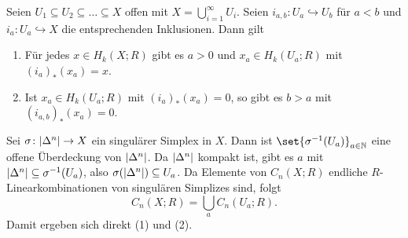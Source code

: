 \begin{proposition}[{name=[{Homologie von $X= \bigcup_{a \in N} U_a$ wobei $U_a \subseteq U_{a+1}$}]},label=prop:1011]
	Seien $U_1 \subseteq U_2 \subseteq \ldots  \subseteq X$ offen mit $X = \bigcup_{i=1}^\infty U_i$. 
	Seien $i_{a,b} \colon U_a \hookrightarrow U_b$ für $a < b$ und $i_a \colon U_a \hookrightarrow X$ die entsprechenden Inklusionen. Dann gilt
	\begin{enumerate}[(1)]
		\item Für jedes $x \in H_k(X;R)$ gibt es $a >0$ und $x_a \in H_k(U_a;R)$ mit $(i_a)_*(x_a)=x$.
		\item Ist $x_a \in H_k(U_a;R)$ mit $(i_a)_*(x_a)=0$, so gibt es $b >a$ mit $(i_{a,b})_*(x_a)=0$.
	\end{enumerate}
\end{proposition}
\begin{beweis}
	Sei $\sigma \colon \abs*{\Delta^n} \to X$ ein singulärer Simplex in $X$. Dann ist $\set{\sigma^{-1}(U_a)}_{a \in \mathbb{N}}$ eine offene Überdeckung von $\abs*{\Delta^n}$. 
	Da $\abs*{\Delta^n}$ kompakt ist, gibt es $a$ mit $\abs*{\Delta^n} \subseteq \sigma ^{-1}(U_a)$, also $\sigma \enbrace*{\abs*{\Delta^n}} \subseteq U_a$. Da Elemente  von
	$C_n(X;R)$ endliche $R$-Linearkombinationen von singulären Simplizes sind, folgt 
	\[
		C_n(X;R) = \bigcup_a C_n(U_a;R).
	\]
	Damit ergeben sich direkt (1) und (2).
\end{beweis}

